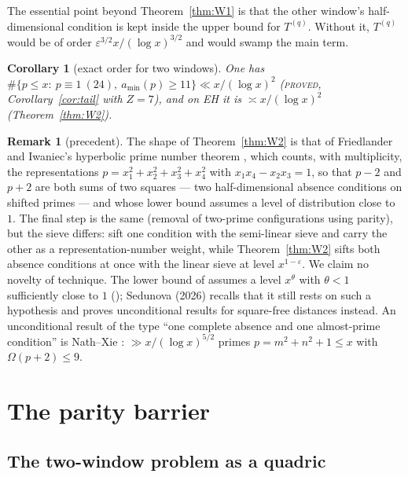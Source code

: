 \documentclass[11pt,reqno]{amsart}
\newtheorem{corollary}[theorem]{Corollary}
\theoremstyle{definition}
\newtheorem{remark}[theorem]{Remark}
\newcommand{\amin}{a_{\min}}
\newcommand{\status}[1]{\textup{\textsc{#1}}}
\begin{document}
The essential point beyond Theorem~\ref{thm:W1} is that the other window's
half-dimensional condition is kept inside the upper bound for
$T^{(q)}$.  Without it, $T^{(q)}$ would be of order
$\varepsilon^{3/2}x/(\log x)^{3/2}$ and would swamp the main term.

\begin{corollary}[exact order for two windows]\label{cor:orders}
One has
$\#\{p\le x:\ p\equiv1\ (24),\ \amin(p)\ge11\}\ll x/(\log x)^2$
(\status{proved}, Corollary~\ref{cor:tail} with $Z=7$), and on EH it is
$\asymp x/(\log x)^2$ (Theorem~\ref{thm:W2}).
\end{corollary}

\begin{remark}[precedent]\label{rem:FI}
The shape of Theorem~\ref{thm:W2} is that of Friedlander and Iwaniec's
hyperbolic prime number theorem \cite{FI09}, which counts, with
multiplicity, the representations $p=x_1^2+x_2^2+x_3^2+x_4^2$ with
$x_1x_4-x_2x_3=1$, so that $p-2$ and $p+2$ are both sums of two squares
--- two half-dimensional absence conditions on shifted primes --- and
whose lower bound assumes a level of distribution close to~$1$.  The
final step is the same (removal of two-prime configurations using
parity), but the sieve differs: \cite{FI09} sift one condition with the
semi-linear sieve and carry the other as a representation-number weight,
while Theorem~\ref{thm:W2} sifts both absence conditions at once with the
linear sieve at level $x^{1-\varepsilon}$.  We claim no novelty of
technique.  The lower bound
of \cite{FI09} assumes a level $x^\theta$ with $\theta<1$ sufficiently close
to $1$ (\cite[Thm.~2 and Assumption $A(\theta)$]{FI09}); Sedunova
\cite{Sed} (2026) recalls that it still rests on such a hypothesis and
proves unconditional results for square-free distances instead.  An
unconditional result of the type ``one complete absence and one
almost-prime condition'' is Nath--Xie \cite[Thm.~1.1]{NX}: $\gg x/(\log x)^{5/2}$
primes $p=m^2+n^2+1\le x$ with $\Omega(p+2)\le9$.
\end{remark}

\section{The parity barrier}\label{sec:parity}

\subsection{The two-window problem as a quadric}
\end{document}
